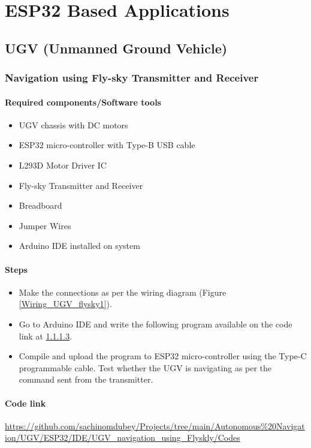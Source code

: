 \chapter{ESP32 Based Applications}
\section{UGV (Unmanned Ground Vehicle)}
\subsection{Navigation using Fly-sky Transmitter and Receiver} 
\subsubsection{Required components/Software tools}
\begin{itemize}
    \item  UGV chassis with DC motors
    \item  ESP32 micro-controller with Type-B USB cable
    \item  L293D Motor Driver IC
    \item  Fly-sky Transmitter and Receiver
    \item  Breadboard
    \item  Jumper Wires
    \item  Arduino IDE installed on system
\end{itemize}

\subsubsection{Steps}
\begin{itemize}
    \item Make the connections as per the wiring diagram (Figure \ref{Wiring_UGV_flysky1}).
    \item Go to Arduino IDE and write the following program available on the code link at \ref{Code_link_UGV_flysky}.
    \item Compile and upload the program to ESP32 micro-controller using the Type-C programmable cable. Test whether the UGV is navigating as per the command sent from the transmitter.
\end{itemize}

\subsubsection{Code link} \label{Code_link_UGV_flysky}
\begin{tcolorbox}
\url{https://github.com/sachinomdubey/Projects/tree/main/Autonomous\%20Navigation/UGV/ESP32/IDE/UGV_navigation_using_Flyskly/Codes}
\end{tcolorbox}

